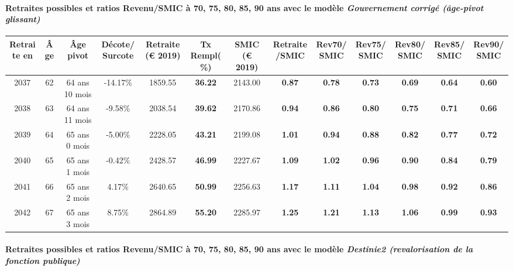 \paragraph{Retraites possibles et ratios Revenu/SMIC à 70, 75, 80, 85, 90 ans avec le modèle \emph{Gouvernement corrigé (âge-pivot glissant)}}  
 
{ \scriptsize \begin{center} 
\begin{tabular}[htb]{|c|c||c|c||c|c||c||c|c|c|c|c|c|} 
\hline 
 Retraite en &  Âge &  Âge pivot &  Décote/Surcote &  Retraite (\euro{} 2019) &  Tx Rempl(\%) &  SMIC (\euro{} 2019) &  Retraite/SMIC &  Rev70/SMIC &  Rev75/SMIC &  Rev80/SMIC &  Rev85/SMIC &  Rev90/SMIC \\ 
\hline \hline 
 2037 &  62 &  64 ans 10 mois &  -14.17\% &  1859.55 &  {\bf 36.22} &  2143.00 &  {\bf {\color{red} 0.87}} &  {\bf {\color{red} 0.78}} &  {\bf {\color{red} 0.73}} &  {\bf {\color{red} 0.69}} &  {\bf {\color{red} 0.64}} &  {\bf {\color{red} 0.60}} \\ 
\hline 
 2038 &  63 &  64 ans 11 mois &  -9.58\% &  2038.54 &  {\bf 39.62} &  2170.86 &  {\bf {\color{red} 0.94}} &  {\bf {\color{red} 0.86}} &  {\bf {\color{red} 0.80}} &  {\bf {\color{red} 0.75}} &  {\bf {\color{red} 0.71}} &  {\bf {\color{red} 0.66}} \\ 
\hline 
 2039 &  64 &  65 ans 0 mois &  -5.00\% &  2228.05 &  {\bf 43.21} &  2199.08 &  {\bf 1.01} &  {\bf {\color{red} 0.94}} &  {\bf {\color{red} 0.88}} &  {\bf {\color{red} 0.82}} &  {\bf {\color{red} 0.77}} &  {\bf {\color{red} 0.72}} \\ 
\hline 
 2040 &  65 &  65 ans 1 mois &  -0.42\% &  2428.57 &  {\bf 46.99} &  2227.67 &  {\bf 1.09} &  {\bf 1.02} &  {\bf {\color{red} 0.96}} &  {\bf {\color{red} 0.90}} &  {\bf {\color{red} 0.84}} &  {\bf {\color{red} 0.79}} \\ 
\hline 
 2041 &  66 &  65 ans 2 mois &  4.17\% &  2640.65 &  {\bf 50.99} &  2256.63 &  {\bf 1.17} &  {\bf 1.11} &  {\bf 1.04} &  {\bf {\color{red} 0.98}} &  {\bf {\color{red} 0.92}} &  {\bf {\color{red} 0.86}} \\ 
\hline 
 2042 &  67 &  65 ans 3 mois &  8.75\% &  2864.89 &  {\bf 55.20} &  2285.97 &  {\bf 1.25} &  {\bf 1.21} &  {\bf 1.13} &  {\bf 1.06} &  {\bf {\color{red} 0.99}} &  {\bf {\color{red} 0.93}} \\ 
\hline 
\hline 
\end{tabular} 
\end{center} } 
\paragraph{Retraites possibles et ratios Revenu/SMIC à 70, 75, 80, 85, 90 ans avec le modèle \emph{Destinie2 (revalorisation de la fonction publique)}}  
 
